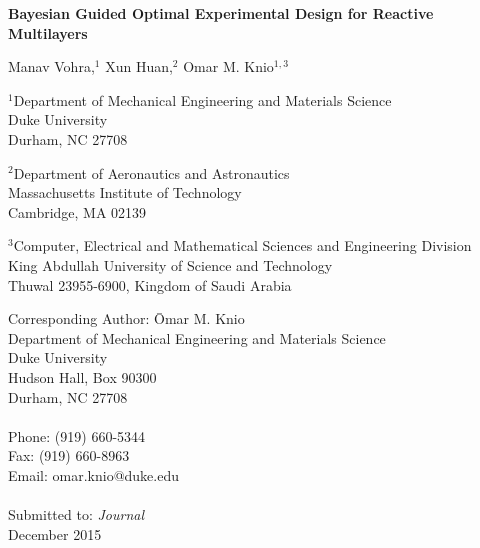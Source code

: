 \begin{center}
\begin{Large}
{\bf Bayesian Guided Optimal Experimental Design for Reactive Multilayers}\\
\end{Large}

\bigskip


Manav Vohra,$^1$ Xun Huan,$^2$ Omar M. Knio$^{1,3}$ \\

\bigskip
\bigskip

\normalsize
$^1$Department of Mechanical Engineering and Materials Science\\
Duke University\\
Durham, NC 27708\\

\bigskip

$^2$Department of Aeronautics and Astronautics\\
Massachusetts Institute of Technology\\
Cambridge, MA 02139\\

\bigskip

$^3$Computer, Electrical and Mathematical Sciences and Engineering Division \\
King Abdullah University of Science and Technology \\
Thuwal 23955-6900, Kingdom of Saudi Arabia\\

\end{center}

\vspace{6cm}

\begin{tabbing}
Corresponding Author: \hspace{5mm} \= Omar M. Knio\\
       \>  Department of Mechanical Engineering and Materials Science\\
       \>  Duke University\\
        Hudson Hall, Box 90300 \\
       \>  Durham, NC 27708 \\
       \> \\
Phone: \> (919) 660-5344 \\
Fax:   \> (919) 660-8963 \\
Email: \>  omar.knio@duke.edu   \\
\\
Submitted to: \> \textit{Journal} \\
\> December 2015\\

\end{tabbing}
\clearpage


